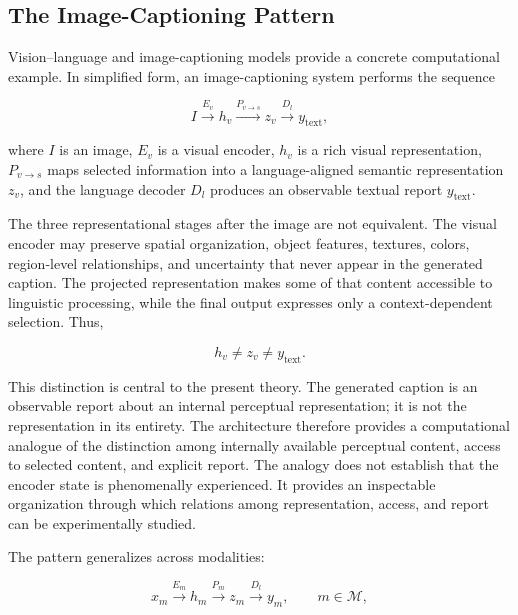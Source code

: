 \subsection{The Image-Captioning Pattern}
\label{subsec:image-captioning-pattern}

Vision--language and image-captioning models provide a concrete computational example. In simplified form, an image-captioning system performs the sequence

\begin{equation}
I
\xrightarrow{E_v}
h_v
\xrightarrow{P_{v\rightarrow s}}
z_v
\xrightarrow{D_l}
y_{\mathrm{text}},
\label{eq:image-captioning-sequence}
\end{equation}

where $I$ is an image, $E_v$ is a visual encoder, $h_v$ is a rich visual representation, $P_{v\rightarrow s}$ maps selected information into a language-aligned semantic representation $z_v$, and the language decoder $D_l$ produces an observable textual report $y_{\mathrm{text}}$.

The three representational stages after the image are not equivalent. The visual encoder may preserve spatial organization, object features, textures, colors, region-level relationships, and uncertainty that never appear in the generated caption. The projected representation makes some of that content accessible to linguistic processing, while the final output expresses only a context-dependent selection. Thus,

\begin{equation}
h_v \neq z_v \neq y_{\mathrm{text}}.
\label{eq:representation-nonidentity}
\end{equation}

This distinction is central to the present theory. The generated caption is an observable report about an internal perceptual representation; it is not the representation in its entirety. The architecture therefore provides a computational analogue of the distinction among internally available perceptual content, access to selected content, and explicit report. The analogy does not establish that the encoder state is phenomenally experienced. It provides an inspectable organization through which relations among representation, access, and report can be experimentally studied.

The pattern generalizes across modalities:

\begin{equation}
x_m
\xrightarrow{E_m}
h_m
\xrightarrow{P_m}
z_m
\xrightarrow{D_l}
y_m,
\qquad m \in \mathcal{M},
\label{eq:general-modality-sequence}
\end{equation}

